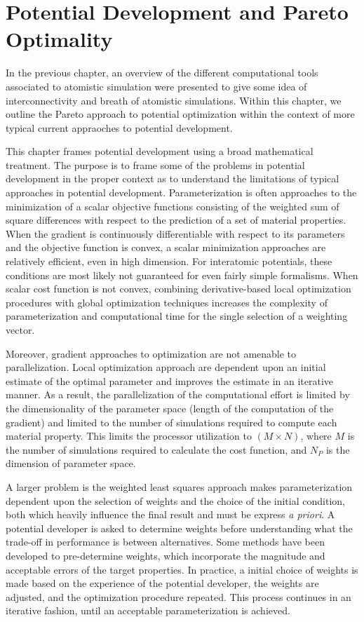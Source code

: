 \chapter{Potential Development and Pareto Optimality}

In the previous chapter, an overview of the different computational tools associated to atomistic simulation were presented to give some idea of interconnectivity and breath of atomistic simulations.  Within this chapter, we outline the Pareto approach to potential optimization within the context of more typical current appraoches to potential development.

This chapter frames potential development using a broad mathematical treatment.  The purpose is to frame some of the problems in potential development in the proper context as to understand the limitations of typical approaches in potential development.  Parameterization is often approaches to the minimization of a scalar objective functions consisting of the weighted sum of square differences with respect to the prediction of a set of material properties.  When the gradient is continuously differentiable with respect to its parameters and the objective function is convex, a scalar minimization approaches are relatively efficient, even in high dimension.  For interatomic potentials, these conditions are most likely not guaranteed for even fairly simple formalisms.  When scalar cost function is not convex, combining derivative-based local optimization procedures with global optimization techniques increases the complexity of parameterization and computational time for the single selection of a weighting vector.

Moreover, gradient approaches to optimization are not amenable to parallelization.  Local optimization approach are dependent upon an initial estimate of the optimal parameter and improves the estimate in an iterative manner.  As a result, the parallelization of the computational effort is limited by the dimensionality of the parameter space (length of the computation of the gradient) and limited to the number of simulations required to compute each material property.  This limits the processor utilization to $(M \times N)$, where $M$ is the number of simulations required to calculate the cost function, and $N_P$ is the dimension of parameter space.

A larger problem is the weighted least squares approach makes parameterization dependent upon the selection of weights and the choice of the initial condition, both which heavily influence the final result and must be express \emph{a priori}. A potential developer is asked to determine weights before understanding what the trade-off in performance is between alternatives.  Some methods have been developed to pre-determine weights, which incorporate the magnitude and acceptable errors of the target properties.  In practice, a initial choice of weights is made based on the experience of the potential developer, the weights are adjusted, and the optimization procedure repeated.  This process continues in an iterative fashion, until an acceptable parameterization is achieved.

